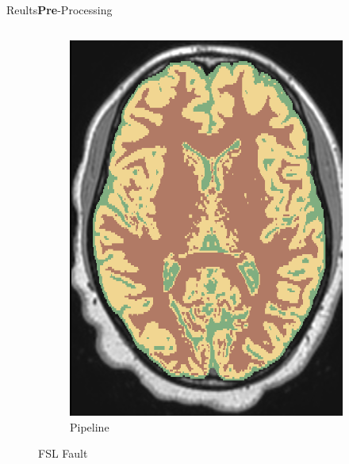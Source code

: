 \documentclass[]{standalone}
\begin{document}
\begin{frame}{Reults}{\textbf{Pre}-Processing}
\begin{columns}
\begin{column}{0.55\textwidth}
\begin{figure}[h!]
\begin{subfigure}[h!]{0.32\textwidth}
				     \includegraphics[scale=0.11]{./IMG/SEG54.png}
				     \caption*{Pipeline}
				\end{subfigure}
				\caption*{FSL Fault}
			\end{figure}
		\end{column}
	\end{columns}
	\end{frame}
\end{document}
